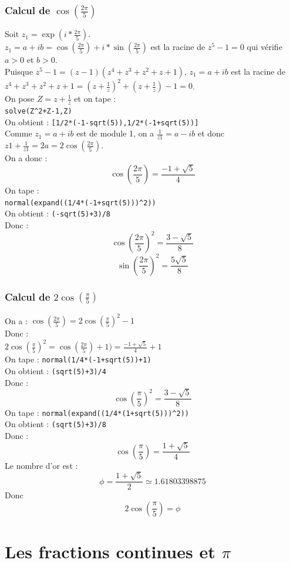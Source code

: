 \documentclass[a4paper,11pt]{book}
\begin{document}
\subsection{Calcul de $\cos(\frac{2\pi}{5})$}
Soit $\displaystyle z_1=\exp(i*\frac{2\pi}{5})$. \\
$\displaystyle z_1=a+ib=\cos(\frac{2\pi}{5})+i*\sin(\frac{2\pi}{5})$ est la racine de 
$z^5-1=0$ qui v\'erifie $a>0$ et $b>0$.\\
Puisque $z^5-1=(z-1)(z^4+z^3+z^2+z+1)$, $z_1=a+ib$ est la racine de 
$z^4+z^3+z^2+z+1=(z+\frac{1}{z})^2+(z+\frac{1}{z})-1=0$.\\
On pose $\displaystyle Z=z+\frac{1}{z}$ et on tape :\\
{\tt solve(Z\verb|^|2+Z-1,Z)}\\
On obtient :
{\tt [1/2*(-1-sqrt(5)),1/2*(-1+sqrt(5))]}\\
Comme $z_1=a+ib$ est de module 1, on a  $\frac{1}{z1}=a-ib$ et donc 
$z1+\frac{1}{z1}=2a=2\cos(\frac{2\pi}{5})$.\\
On a donc :
$$\cos(\frac{2\pi}{5})=\frac{-1+\sqrt 5}{4}$$
On tape :\\
{\tt normal(expand((1/4*(-1+sqrt(5)))\verb|^|2))}\\
On obtient :
{\tt (-sqrt(5)+3)/8}\\
Donc :
$$\cos(\frac{2\pi}{5})^2=\frac{3-\sqrt 5}{8}$$
$$\sin(\frac{2\pi}{5})^2=\frac{5\sqrt 5}{8}$$
\subsection{Calcul de $2\cos(\frac{\pi}{5})$}
On a :
$\displaystyle \cos(\frac{2\pi}{5})=2\cos(\frac{\pi}{5})^2-1$\\
Donc :\\
$2\cos(\frac{\pi}{5})^2=\cos(\frac{2\pi}{5})+1)=\frac{-1+\sqrt 5}{4}+1$\\
On tape :
{\tt normal(1/4*(-1+sqrt(5))+1)}\\
On obtient :
{\tt (sqrt(5)+3)/4}\\
Donc :
$$\cos(\frac{\pi}{5})^2=\frac{3-\sqrt 5}{8}$$
On tape :
{\tt normal(expand((1/4*(1+sqrt(5)))\verb|^|2))}\\
On obtient :
{\tt (sqrt(5)+3)/8}\\
Donc :
$$\cos(\frac{\pi}{5})=\frac{1+\sqrt 5}{4}$$
Le nombre d'or est :
$$\phi=\frac{1+\sqrt 5}{2}\simeq 1.61803398875$$
Donc $$2\cos(\frac{\pi}{5})=\phi$$
\chapter{Les fractions continues et $\pi$}
\end{document}
